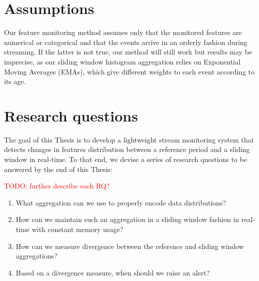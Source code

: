 \section{Assumptions}
Our feature monitoring method assumes only that the monitored features are numerical or categorical and that the events arrive in an orderly fashion during streaming. If the latter is not true, our method will still work but results may be imprecise, as our sliding window histogram aggregation relies on Exponential Moving Averages (EMAs), which give different weights to each event according to its age.

\section{Research questions}
The goal of this Thesis is to develop a lightweight stream monitoring system that detects changes in features distribution between a reference period and a sliding window in real-time. To that end, we devise a series of research questions to be answered by the end of this Thesis:

\textcolor{red}{TODO: further describe each RQ?}

\begin{enumerate}[leftmargin=1.75cm, label=\textbf{(RQ\arabic*)}]
    \item What aggregation can we use to properly encode data distributions?
    \item How can we maintain such an aggregation in a sliding window fashion in real-time with constant memory usage?
    \item How can we measure divergence between the reference and sliding window aggregations?
    \item Based on a divergence measure, when should we raise an alert?
\end{enumerate}
